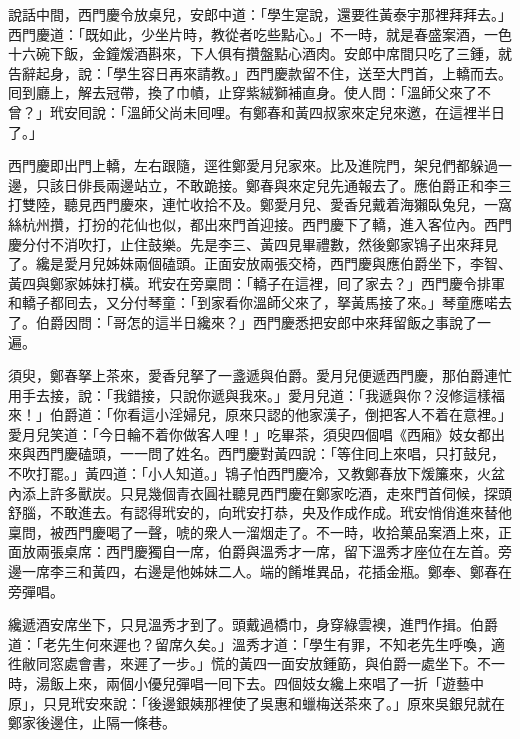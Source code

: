 說話中間，西門慶令放桌兒，安郎中道：「學生寔說，還要徃黃泰宇那裡拜拜去。」西門慶道：「既如此，少坐片時，教從者吃些點心。」不一時，就是春盛案酒，一色十六碗下飯，金鐘煖酒斟來，下人俱有攢盤點心酒肉。安郎中席間只吃了三鍾，就告辭起身，說：「學生容日再來請教。」西門慶款留不住，送至大門首，上轎而去。囘到廳上，解去冠帶，換了巾幘，止穿紫絨獅補直身。使人問：「溫師父來了不曾？」玳安囘說：「溫師父尚未囘哩。有鄭春和黃四叔家來定兒來邀，在這裡半日了。」

西門慶即出門上轎，左右跟隨，逕徃鄭愛月兒家來。比及進院門，架兒們都躲過一邊，只該日俳長兩邊站立，不敢跪接。{}鄭春與來定兒先通報去了。應伯爵正和李三打雙陸，聽見西門慶來，連忙收拾不及。鄭愛月兒、愛香兒戴着海獺臥兔兒，一窩絲杭州攢，打扮的花仙也似，都出來門首迎接。西門慶下了轎，進入客位內。西門慶分付不消吹打，{}止住鼓樂。先是李三、黃四見畢禮數，然後鄭家鴇子出來拜見了。纔是愛月兒姊妹兩個磕頭。正面安放兩張交椅，西門慶與應伯爵坐下，李智、黃四與鄭家姊妹打橫。玳安在旁稟問：「轎子在這裡，囘了家去？」西門慶令排軍和轎子都囘去，又分付琴童：「到家看你溫師父來了，拏黃馬接了來。」琴童應喏去了。伯爵因問：「哥怎的這半日纔來？」西門慶悉把安郎中來拜留飯之事說了一遍。

須臾，鄭春拏上茶來，愛香兒拏了一盞遞與伯爵。愛月兒便遞西門慶，那伯爵連忙用手去接，說：「我錯接，只說你遞與我來。」愛月兒道：「我遞與你？沒修這樣福來！」伯爵道：「你看這小淫婦兒，原來只認的他家漢子，倒把客人不着在意裡。」{}愛月兒笑道：「今日輪不着你做客人哩！」吃畢茶，須臾四個唱《西廂》妓女都出來與西門慶磕頭，一一問了姓名。西門慶對黃四說：「等住囘上來唱，只打鼓兒，不吹打罷。」黃四道：「小人知道。」鴇子怕西門慶冷，又教鄭春放下煖簾來，火盆內添上許多獸炭。只見幾個青衣圓社聽見西門慶在鄭家吃酒，走來門首伺候，探頭舒腦，不敢進去。有認得玳安的，向玳安打恭，央及作成作成。玳安悄俏進來替他稟問，被西門慶喝了一聲，{}唬的衆人一溜烟走了。不一時，收拾菓品案酒上來，正面放兩張桌席：西門慶獨自一席，伯爵與溫秀才一席，留下溫秀才座位在左首。旁邊一席李三和黃四，右邊是他姊妹二人。端的餚堆異品，花插金瓶。鄭奉、鄭春在旁彈唱。

纔遞酒安席坐下，只見溫秀才到了。頭戴過橋巾，身穿綠雲襖，進門作揖。伯爵道：「老先生何來遲也？留席久矣。」溫秀才道：「學生有罪，不知老先生呼喚，適徃敝同窓處會書，來遲了一步。」{}{}慌的黃四一面安放鍾筯，與伯爵一處坐下。不一時，湯飯上來，兩個小優兒彈唱一囘下去。四個妓女纔上來唱了一折「遊藝中原」，只見玳安來說：「後邊銀姨那裡使了吳惠和蠟梅送茶來了。」原來吳銀兒就在鄭家後邊住，止隔一條巷。

